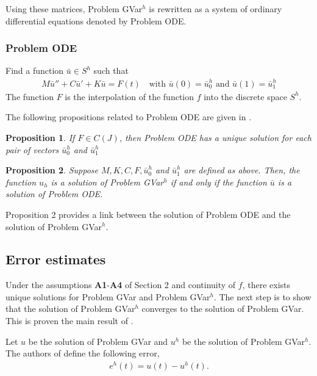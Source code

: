 \documentclass[../../main.tex]{subfiles}
\begin{document}
Using these matrices, Problem GVar$^h$ is rewritten as a system of ordinary
differential equations denoted by Problem ODE. \subsubsection*{Problem ODE}
Find a function $\bar{u} \in S^h$ such that \label{sym:baru}
\begin{eqnarray}
	M\bar{u}'' + C \bar{u}' + K\bar{u} = F(t) \ \ \ \textrm{ with } \bar{u}(0) = \bar{u}^h_0 \textrm{ and }  \bar{u}(1) = \bar{u}^h_1 \label{ODE}
\end{eqnarray}
The function $F$ is the interpolation of the function $f$ into the discrete space $S^h$.

The following propositions related to Problem ODE are given in \cite{BV13}.

\newtheorem{DC_Prop2}{Proposition}
\begin{DC_Prop2}
	If $F\in C(J)$, then Problem ODE has a unique solution for each pair of vectors $\bar{u}^h_0$ and $\bar{u}^h_1$
\end{DC_Prop2}

\newtheorem{DC_Prop3}[DC_Prop2]{Proposition}
\begin{DC_Prop3}
	Suppose $M, K, C, F,\bar{u}^h_0$ and $\bar{u}^h_1$ are defined as above. Then, the function $u_{h}$ is a solution of Problem GVar$^{h}$ if and only if the function $\bar{u}$ is a solution of Problem ODE.
\end{DC_Prop3}

Proposition 2 provides a link between the solution of Problem ODE and the
solution of Problem GVar$^h$.

\subsection{Error estimates}\label{e_est}
Under the assumptions \textbf{A1}-\textbf{A4} of Section 2 and continuity of $f$, there exists unique solutions for Problem GVar and Problem GVar$^h$. The next step is to show that the solution of Problem GVar$^h$ converges to the solution of Problem GVar. This is proven the main result of \cite{BV13}.

Let $u$ be the solution of Problem GVar and $u^h$ be the solution of Problem GVar$^h$. The authors of \cite{BV13} define the following error,
\begin{eqnarray}
	e^h(t) = u(t) - u^h(t). \label{Error}
\end{eqnarray}
\end{document}

